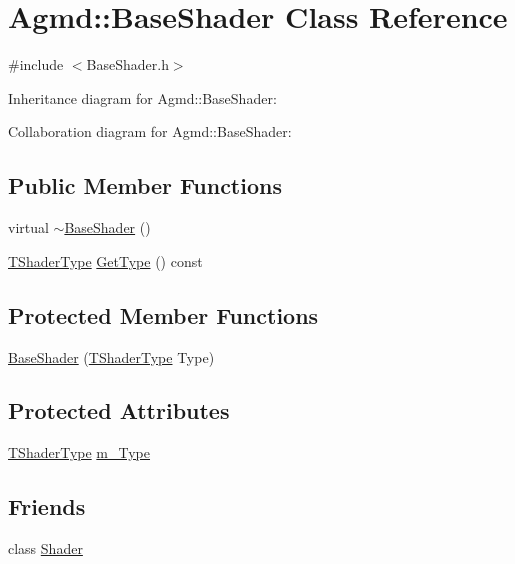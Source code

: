 \hypertarget{class_agmd_1_1_base_shader}{\section{Agmd\+:\+:Base\+Shader Class Reference}
\label{class_agmd_1_1_base_shader}
}


{\ttfamily \#include $<$Base\+Shader.\+h$>$}



Inheritance diagram for Agmd\+:\+:Base\+Shader\+:


Collaboration diagram for Agmd\+:\+:Base\+Shader\+:
\subsection*{Public Member Functions}
\begin{DoxyCompactItemize}
\item 
virtual \hyperlink{class_agmd_1_1_base_shader_a62d80f920748d1d440b25ca51bb05469}{$\sim$\+Base\+Shader} ()
\item 
\hyperlink{namespace_agmd_a162a493eaff1589f07a505806e6724b4}{T\+Shader\+Type} \hyperlink{class_agmd_1_1_base_shader_aa39144e11d0faae57b40508f084e37a6}{Get\+Type} () const 
\end{DoxyCompactItemize}
\subsection*{Protected Member Functions}
\begin{DoxyCompactItemize}
\item 
\hyperlink{class_agmd_1_1_base_shader_a064e3ca7e2a407faee85c6918d418793}{Base\+Shader} (\hyperlink{namespace_agmd_a162a493eaff1589f07a505806e6724b4}{T\+Shader\+Type} Type)
\end{DoxyCompactItemize}
\subsection*{Protected Attributes}
\begin{DoxyCompactItemize}
\item 
\hyperlink{namespace_agmd_a162a493eaff1589f07a505806e6724b4}{T\+Shader\+Type} \hyperlink{class_agmd_1_1_base_shader_ac0bbd74caaf0776c9a7f030693b8d6ba}{m\+\_\+\+Type}
\end{DoxyCompactItemize}
\subsection*{Friends}
\begin{DoxyCompactItemize}
\item 
class \hyperlink{class_agmd_1_1_base_shader_a03c2d524ace9ade9c3f55b43c99bcea1}{Shader}
\end{DoxyCompactItemize}


